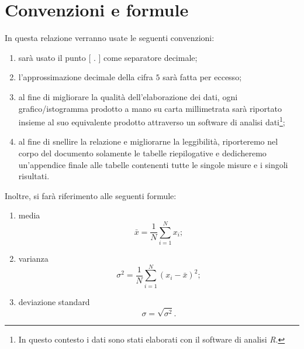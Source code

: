 \documentclass[10pt,oneside,a4paper]{article}
\begin{document}
\section{Convenzioni e formule}
In questa relazione verranno usate le seguenti convenzioni:
\begin{enumerate}
	\item sarà usato il punto [ $.$ ] come separatore decimale;
	\item l'approssimazione decimale della cifra $5$ sarà fatta per eccesso;
	\item al fine di migliorare la qualità dell'elaborazione dei dati, ogni grafico/istogramma prodotto a mano su carta millimetrata sarà riportato insieme al suo equivalente prodotto attraverso un software di analisi dati\footnote{In questo contesto i dati sono stati elaborati con il software di analisi \emph{R}.};
	\item al fine di snellire la relazione e migliorarne la leggibilità, riporteremo nel corpo del documento solamente le tabelle riepilogative e dedicheremo un'appendice finale alle tabelle contenenti tutte le singole misure e i singoli risultati. %
\end{enumerate}
Inoltre, si farà riferimento alle seguenti formule:
\begin{enumerate}
	\item media 
	\begin{equation}\label{eq:media}
	\bar{x} = \frac{1}{N}\sum_{i=1}^Nx_i;
	\end{equation}
	\item varianza
	\begin{equation}\label{eq:varianza}
	\sigma^2 = \frac{1}{N}\sum_{i=1}^N(x_i-\bar{x})^2;
	\end{equation}
	\item deviazione standard
	\begin{equation}\label{eq:deviazione}
	\sigma = \sqrt{\sigma^2}.
	\end{equation}	
\end{enumerate}

\end{document}
